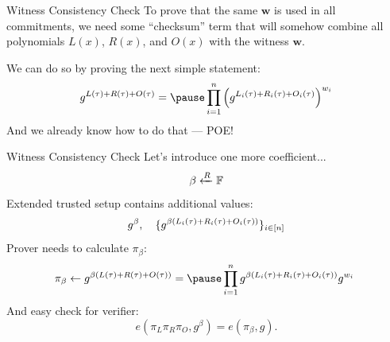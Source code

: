 \documentclass{zkdl-presentation-template}
\begin{document}
    \begin{frame}{Witness Consistency Check}
        \pause
        To prove that the same $\mathbf{w}$ is used in all commitments, we need some ``checksum''
        term that will somehow combine all polynomials $L(x)$, $R(x)$, and $O(x)$ with the witness
        $\mathbf{w}$.

        \pause
        We can do so by proving the next simple statement:
        \vspace{-5pt}
        \begin{equation*}
            g^{L(\tau) + R(\tau) + O(\tau)} = \pause \prod_{i=1}^n {\left(g^{L_i(\tau) + R_i(\tau) + O_i(\tau)}\right)}^{w_i}
            \vspace{-5pt}
        \end{equation*}
        \pause
        And we already know how to do that --- POE!
    \end{frame}

    \begin{frame}{Witness Consistency Check}
        Let's introduce one more coefficient...
        \vspace{-5pt}
        \begin{equation*}
            \beta \xleftarrow{R} \mathbb{F}
            \vspace{-5pt}
        \end{equation*}
        \pause
        Extended trusted setup contains additional values:
        \vspace{-5pt}
        \begin{equation*}
            g^{\beta}, \quad \{g^{\beta(L_i(\tau) + R_i(\tau) + O_i(\tau))}\}_{i \in \left[ n \right]}
            \vspace{-5pt}
        \end{equation*}
        \pause
        Prover needs to calculate $\pi_{\beta}$:
        \vspace{-5pt}
        \begin{equation*}
            \pi_{\beta} \gets g^{\beta(L(\tau) + R(\tau) + O(\tau))} = \pause \prod_{i=1}^{n} g^{\beta(L_i(\tau) + R_i(\tau) + O_i(\tau))}g^{w_i}\
        \end{equation*}
        \pause
        And easy check for verifier:
        \vspace{-5pt}
        \begin{equation*}
            e(\pi_L\pi_R\pi_O, g^{\beta}) = e(\pi_{\beta}, g).
        \end{equation*}
    \end{frame}
\end{document}
